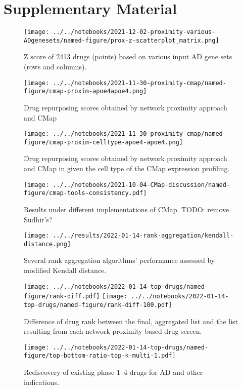 \documentclass[letterpaper]{article}
\begin{document}


\section*{Supplementary Material}

\setcounter{table}{0}
\makeatletter 
\renewcommand{\figurename}{Supplementary Table} %
\makeatother

\setcounter{figure}{0}
\makeatletter 
\renewcommand{\figurename}{Supplementary Figure} %
\makeatother

\begin{figure}[p]
\texttt{[image: ../../notebooks/2021-12-02-proximity-various-ADgenesets/named-figure/prox-z-scatterplot\_matrix.png]}
\caption{
Z score of 2413 drugs (points) based on various input AD gene sets (rows and
columns).
}
\label{fig:prox-z-scatterplot-m}
\end{figure}

\begin{figure}[p]
\texttt{[image: ../../notebooks/2021-11-30-proximity-cmap/named-figure/cmap-proxim-apoe4apoe4.png]}
\caption{
Drug repurposing scores obtained by network proximity approach and CMap
}
\label{fig:proxim-cmap}
\end{figure}

\begin{figure}[p]
\texttt{[image: ../../notebooks/2021-11-30-proximity-cmap/named-figure/cmap-proxim-celltype-apoe4-apoe4.png]}
\caption{
Drug repurposing scores obtained by network proximity approach and CMap in
given the cell type of the CMap expression profiling.
}
\label{fig:proxim-cmap-celltype}
\end{figure}

\begin{figure}[p]
\texttt{[image: ../../notebooks/2021-10-04-CMap-discussion/named-figure/cmap-tools-consistency.pdf]}
\caption{
Results under different implementations of CMap.
TODO: remove Sudhir's?
}
\label{fig:cmap-cmap}
\end{figure}

\begin{figure}[p]
\texttt{[image: ../../results/2022-01-14-rank-aggregation/kendall-distance.png]}
\caption{
Several rank aggregation algorithms' performance assessed by modified Kendall
distance.
}
\label{fig:kendall-dist}
\end{figure}

\begin{figure}[p]
\texttt{[image: ../../notebooks/2022-01-14-top-drugs/named-figure/rank-diff.pdf]}
\texttt{[image: ../../notebooks/2022-01-14-top-drugs/named-figure/rank-diff-100.pdf]}
\caption{
Difference of drug rank between the final, aggregated list and the list
resulting from each network proximity based drug screen.
}
\label{fig:rank-diff}
\end{figure}

\begin{figure}[p]
\texttt{[image: ../../notebooks/2022-01-14-top-drugs/named-figure/top-bottom-ratio-top-k-multi-1.pdf]}
\caption{
Rediscovery of existing phase 1--4 drugs for AD and other indications.
}
\label{fig:ad-drug-rediscovery-multi}
\end{figure}
\end{document}
